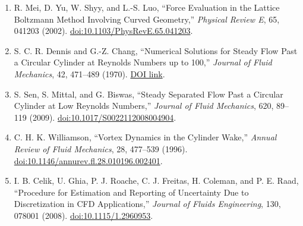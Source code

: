 \documentclass[11pt]{article}
\begin{document}
\begin{enumerate}
\item R. Mei, D. Yu, W. Shyy, and L.-S. Luo, ``Force Evaluation in the Lattice Boltzmann Method Involving Curved Geometry,'' \emph{Physical Review E}, 65, 041203 (2002). \href{https://doi.org/10.1103/PhysRevE.65.041203}{doi:10.1103/PhysRevE.65.041203}.
\item S. C. R. Dennis and G.-Z. Chang, ``Numerical Solutions for Steady Flow Past a Circular Cylinder at Reynolds Numbers up to 100,'' \emph{Journal of Fluid Mechanics}, 42, 471--489 (1970). \href{https://doi.org/10.1017/S0022112070001428}{DOI link}.
\item S. Sen, S. Mittal, and G. Biswas, ``Steady Separated Flow Past a Circular Cylinder at Low Reynolds Numbers,'' \emph{Journal of Fluid Mechanics}, 620, 89--119 (2009). \href{https://doi.org/10.1017/S0022112008004904}{doi:10.1017/S0022112008004904}.
\item C. H. K. Williamson, ``Vortex Dynamics in the Cylinder Wake,'' \emph{Annual Review of Fluid Mechanics}, 28, 477--539 (1996). \href{https://doi.org/10.1146/annurev.fl.28.010196.002401}{doi:10.1146/annurev.fl.28.010196.002401}.
\item I. B. Celik, U. Ghia, P. J. Roache, C. J. Freitas, H. Coleman, and
P. E. Raad, ``Procedure for Estimation and Reporting of Uncertainty Due to
Discretization in CFD Applications,'' \emph{Journal of Fluids Engineering},
130, 078001 (2008). \href{https://doi.org/10.1115/1.2960953}{doi:10.1115/1.2960953}.
\end{enumerate}
\end{document}
